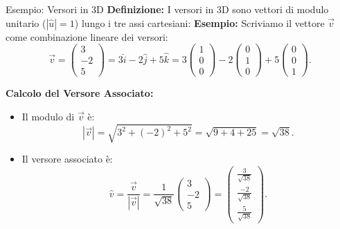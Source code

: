 \documentclass{beamer}
\begin{document}
\begin{frame}{Esempio: Versori in 3D}
    \textbf{Definizione:} I versori in 3D sono vettori di modulo unitario ($|\hat{u}| = 1$) lungo i tre assi cartesiani:
    \textbf{Esempio:} Scriviamo il vettore $\vec{v}$ come combinazione lineare dei versori:
    \[
    \vec{v} =
    \begin{pmatrix}
        3 \\
        -2 \\
        5
    \end{pmatrix}
    = 3 \hat{i} - 2 \hat{j} + 5 \hat{k} = 3  \begin{pmatrix}
        1 \\
        0 \\
        0
    \end{pmatrix} -2     \begin{pmatrix}
        0 \\
        1 \\
        0
    \end{pmatrix}  + 5     \begin{pmatrix}
        0 \\
        0 \\
        1
    \end{pmatrix}.
    \]

    \textbf{Calcolo del Versore Associato:}
    \begin{itemize}
        \item Il modulo di $\vec{v}$ è:
        \[
        |\vec{v}| = \sqrt{3^2 + (-2)^2 + 5^2} = \sqrt{9 + 4 + 25} = \sqrt{38}.
        \]
        \item Il versore associato è:
        \[
        \hat{v} = \frac{\vec{v}}{|\vec{v}|} =
        \frac{1}{\sqrt{38}}
        \begin{pmatrix}
            3 \\
            -2 \\
            5
        \end{pmatrix}
        =
        \begin{pmatrix}
            \frac{3}{\sqrt{38}} \\
            \frac{-2}{\sqrt{38}} \\
            \frac{5}{\sqrt{38}}
        \end{pmatrix}.
        \]
    \end{itemize}

\end{frame}
\end{document}
